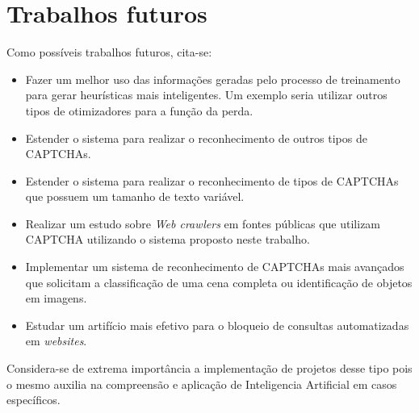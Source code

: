 \section{Trabalhos futuros}

Como possíveis trabalhos futuros, cita-se: 

\begin{itemize}

        \item Fazer um melhor uso das informações geradas pelo
          processo de treinamento para gerar heurísticas mais
          inteligentes. Um exemplo seria utilizar outros tipos de
          otimizadores para a função da perda.

        \item Estender o sistema para realizar o reconhecimento de
          outros tipos de CAPTCHAs.

        \item Estender o sistema para realizar o reconhecimento de
          tipos de CAPTCHAs que possuem um tamanho de texto variável.

        \item Realizar um estudo sobre \textit{Web crawlers} em fontes
          públicas que utilizam CAPTCHA utilizando o sistema proposto
          neste trabalho.

        \item Implementar um sistema de reconhecimento de CAPTCHAs
          mais avançados que solicitam a classificação de uma cena
          completa ou identificação de objetos em imagens.

        \item Estudar um artifício mais efetivo para o bloqueio de
          consultas automatizadas em \textit{websites}.

\end{itemize}

Considera-se de extrema importância a implementação de projetos desse
tipo pois o mesmo auxilia na compreensão e aplicação de Inteligencia 
Artificial em casos específicos.
